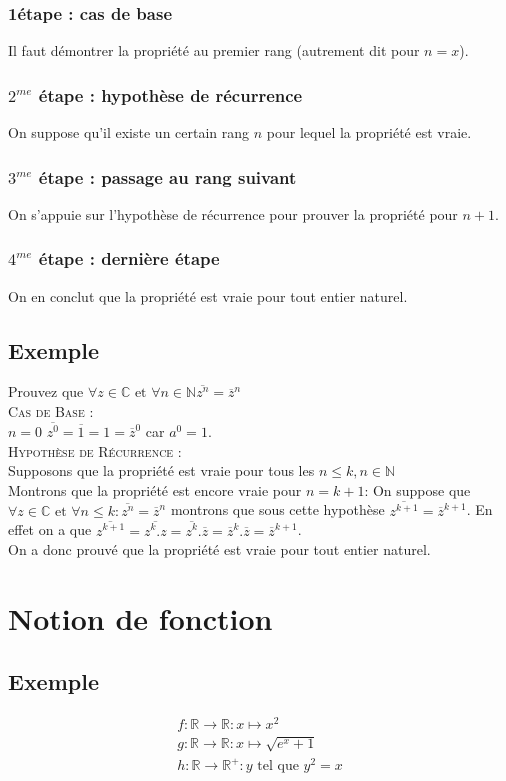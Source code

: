 \documentclass[a4paper,10pt]{report}
\begin{document}
\subsection{1\iere étape : cas de base}
Il faut démontrer la propriété au premier rang (autrement dit pour $n=x$).
\subsection{$2^{me}$ étape : hypothèse de récurrence}
On suppose qu'il existe un certain rang $n$ pour lequel la propriété est vraie.
\subsection{$3^{me}$ étape : passage au rang suivant}
On s'appuie sur l'hypothèse de récurrence pour prouver la propriété pour $n+1$.
\subsection{$4^{me}$ étape : dernière étape}
On en conclut que la propriété est vraie pour tout entier naturel.
\section{Exemple}
Prouvez que $\forall z \in \mathbb{C} \mbox{ et } \forall n \in \mathbb{N} \overline {z^n}=\overline{z}^n$ \\
\textsc{Cas de Base} :\\
$n=0$
$\overline{z^0}=\overline{1}=1=\overline{z}^0$ car $a^0=1$.\\
\textsc{Hypothèse de Récurrence} :\\
Supposons que la propriété est vraie pour tous les $n \leq k,n \in \mathbb{N}$\\
Montrons que la propriété est encore vraie pour $n=k+1$:
On suppose que $\forall z \in \mathbb{C} \mbox{ et } \forall n \leq k : \overline{z^n}=\overline{z}^n$ montrons que sous cette hypothèse $\overline{z^{k+1}}=\overline{z}^{k+1}$.
En effet on a que $\overline{z^{k+1}}=\overline{z^k.z}=\overline{z^k}.\overline{z}=\overline{z}^k.\overline{z}=\overline{z}^{k+1}$.\\
On a donc prouvé que la propriété est vraie pour tout entier naturel.

\newpage \chapter{Notion de fonction}
\section{Exemple}
\begin{eqnarray*}
f:\mathbb{R} \rightarrow \mathbb{R} : x \mapsto x^2\\
g:\mathbb{R} \rightarrow \mathbb{R} : x \mapsto \sqrt{e^x+1}\\
h:\mathbb{R} \rightarrow \mathbb{R}^+ : y \mbox{ tel que } y^2=x\\
\end{eqnarray*}
\end{document}
